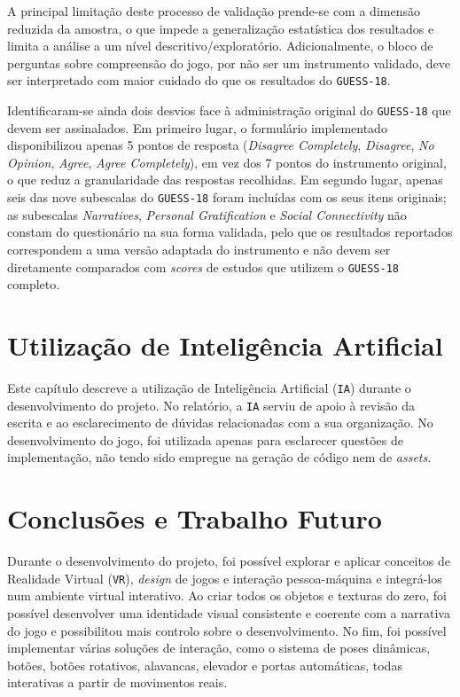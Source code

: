 \documentclass[a4paper, 12pt]{book}
\begin{document}
A principal limitação deste processo de validação prende-se com a dimensão
reduzida da amostra, o que impede a generalização estatística dos resultados
e limita a análise a um nível descritivo/exploratório. Adicionalmente, o
bloco de perguntas sobre compreensão do jogo, por não ser um instrumento
validado, deve ser interpretado com maior cuidado do que os resultados do
\texttt{GUESS-18}.
\par
Identificaram-se ainda dois desvios face à administração original do
\texttt{GUESS-18} que devem ser assinalados. Em primeiro lugar, o
formulário implementado disponibilizou apenas 5 pontos de resposta
(\textit{Disagree Completely}, \textit{Disagree}, \textit{No Opinion},
\textit{Agree}, \textit{Agree Completely}), em vez dos 7 pontos do
instrumento original, o que reduz a granularidade das respostas
recolhidas. Em segundo lugar, apenas seis das nove subescalas do
\texttt{GUESS-18} foram incluídas com os seus itens originais; as
subescalas \textit{Narratives}, \textit{Personal Gratification} e
\textit{Social Connectivity} não constam do questionário na sua forma
validada, pelo que os resultados reportados correspondem a uma versão
adaptada do instrumento e não devem ser diretamente comparados com
\textit{scores} de estudos que utilizem o \texttt{GUESS-18} completo.

\chapter{Utilização de Inteligência Artificial} \label{ch:utilizacao-ia}

Este capítulo descreve a utilização de Inteligência Artificial (\texttt{IA})
durante o desenvolvimento do projeto. No relatório, a \texttt{IA} serviu de
apoio à revisão da escrita e ao esclarecimento de dúvidas relacionadas com a sua
organização. No desenvolvimento do jogo, foi utilizada apenas para esclarecer
questões de implementação, não tendo sido empregue na geração de código nem de
\textit{assets}.
\chapter{Conclusões e Trabalho Futuro}
\label{ch:conclusoes}
Durante o desenvolvimento do projeto, foi possível explorar e aplicar conceitos de 
Realidade Virtual (\texttt{VR}), \textit{design} de jogos e interação pessoa-máquina e integrá-los num ambiente virtual 
interativo. Ao criar todos os objetos e texturas do zero, foi possível desenvolver uma identidade visual 
consistente e coerente com a narrativa do jogo e possibilitou mais controlo sobre o desenvolvimento. 
No fim, foi possível implementar várias soluções de interação, como o sistema
de poses dinâmicas, botões, botões rotativos, alavancas, elevador e portas automáticas, 
todas interativas a partir de movimentos reais.
\end{document}
